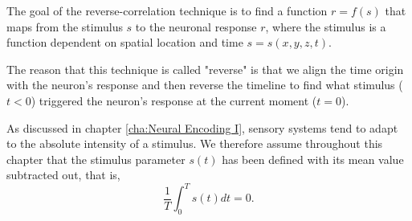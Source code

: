 \begin{rem}
  The goal of the reverse-correlation technique is to find a function $r = f(s)$ that maps from the stimulus $s$ to the neuronal response $r$, where the stimulus is a function dependent on spatial location and time $s = s(x,y,z,t)$. 
\end{rem}

\begin{rem}
  The reason that this technique is called "reverse" is that we align the time origin with the neuron's response and then reverse the timeline to find what stimulus ($t<0$) triggered the neuron's response at the current moment ($t=0$).
\end{rem}



\begin{asm}
  \label{asm:stimulus}
  As discussed in chapter \ref{cha:Neural Encoding I}, sensory systems tend to adapt to the absolute intensity of a stimulus. We therefore assume throughout this chapter that the stimulus parameter $s(t)$ has been defined with its mean value subtracted out, that is,
  \begin{equation}
    \label{equ:adaptionAssumption}
    \frac{1}{T}\int_0^Ts(t)dt = 0.
  \end{equation}
\end{asm}

